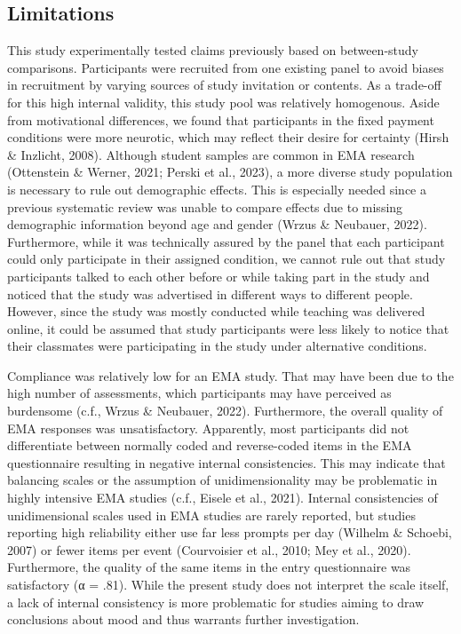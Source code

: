 \documentclass[authordate, empirical,issue]{jote-new-article}
\begin{document}
	\subsection{Limitations}



	This study experimentally tested claims previously based on between-study comparisons. Participants were recruited from one existing panel to avoid biases in recruitment by varying sources of study invitation or contents. As a trade-off for this high internal validity, this study pool was relatively homogenous. Aside from motivational differences, we found that participants in the fixed payment conditions were more neurotic, which may reflect their desire for certainty (Hirsh \& Inzlicht, 2008). Although student samples are common in EMA research (Ottenstein \& Werner, 2021; Perski et al., 2023), a more diverse study population is necessary to rule out demographic effects. This is especially needed since a previous systematic review was unable to compare effects due to missing demographic information beyond age and gender (Wrzus \& Neubauer, 2022). Furthermore, while it was technically assured by the panel that each participant could only participate in their assigned condition, we cannot rule out that study participants talked to each other before or while taking part in the study and noticed that the study was advertised in different ways to different people. However, since the study was mostly conducted while teaching was delivered online, it could be assumed that study participants were less likely to notice that their classmates were participating in the study under alternative conditions.



	Compliance was relatively low for an EMA study. That may have been due to the high number of assessments, which participants may have perceived as burdensome (c.f., Wrzus \& Neubauer, 2022). Furthermore, the overall quality of EMA responses was unsatisfactory. Apparently, most participants did not differentiate between normally coded and reverse-coded items in the EMA questionnaire resulting in negative internal consistencies. This may indicate that balancing scales or the assumption of unidimensionality may be problematic in highly intensive EMA studies (c.f., Eisele et al., 2021). Internal consistencies of unidimensional scales used in EMA studies are rarely reported, but studies reporting high reliability either use far less prompts per day (Wilhelm \& Schoebi, 2007) or fewer items per event (Courvoisier et al., 2010; Mey et al., 2020). Furthermore, the quality of the same items in the entry questionnaire was satisfactory (α = .81). While the present study does not interpret the scale itself, a lack of internal consistency is more problematic for studies aiming to draw conclusions about mood and thus warrants further investigation.
\end{document}
